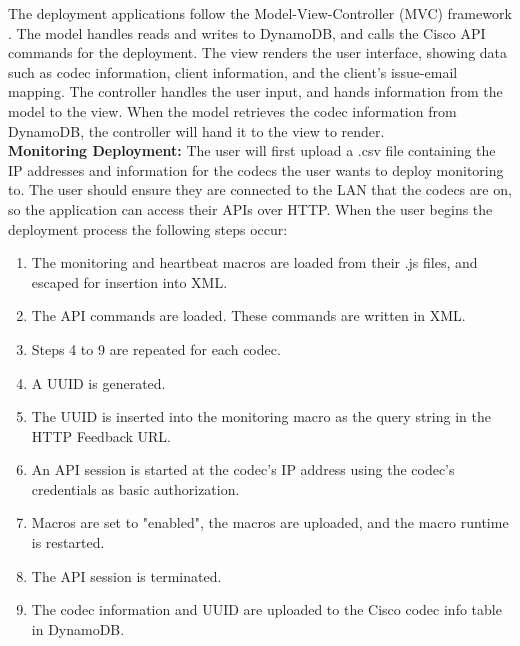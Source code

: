 \documentclass[letterpaper,12pt]{article}
\begin{document}
The deployment applications follow the Model-View-Controller (MVC) framework \cite{mvc}. The model handles reads and writes to DynamoDB, and calls the Cisco API commands for the deployment. The view renders the user interface, showing data such as codec information, client information, and the client's issue-email mapping. The controller handles the user input, and hands information from the model to the view. When the model retrieves the codec information from DynamoDB, the controller will hand it to the view to render.\\

\textbf{Monitoring Deployment:} The user will first upload a .csv file containing the IP addresses and information for the codecs the user wants to deploy monitoring to. The user should ensure they are connected to the LAN that the codecs are on, so the application can access their APIs over HTTP. When the user begins the deployment process the following steps occur:
\begin{enumerate}
	\item The monitoring and heartbeat macros are loaded from their .js files, and escaped for insertion into XML.
    \item The API commands are loaded. These commands are written in XML.
    \item Steps 4 to 9 are repeated for each codec.
    \item A UUID is generated.
    \item The UUID is inserted into the monitoring macro as the query string in the HTTP Feedback URL.
    \item An API session is started at the codec's IP address using the codec's credentials as basic authorization.
    \item Macros are set to "enabled", the macros are uploaded, and the macro runtime is restarted.
    \item The API session is terminated.
    \item The codec information and UUID are uploaded to the Cisco codec info table in DynamoDB.
\end{enumerate}
\end{document}
